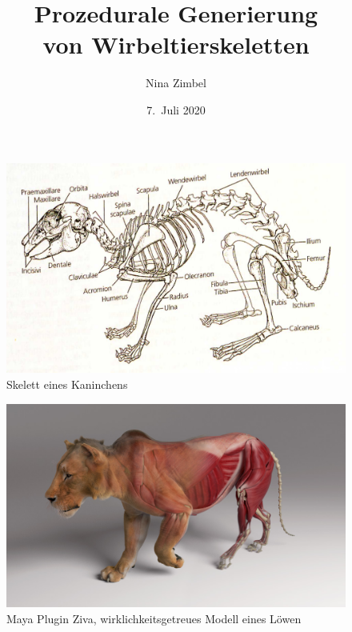 \documentclass{beamer}
\title{Prozedurale Generierung\\ von Wirbeltierskeletten}
\author{Nina Zimbel}
\institute{KIT - Institut für Visualisierung und Datenanalyse}
\date{7.\ Juli 2020}
\begin{document}
\begin{frame}
 \maketitle
\end{frame}

\begin{frame}[focus]
 \begin{figure}
  \centering
  \includegraphics[width=\textwidth]{graphics/kaninchen.jpg}
  \caption{Skelett eines Kaninchens \cite{Spezielle_Zoologie}}
 \end{figure}
\end{frame}

\begin{frame}[focus]
 \begin{figure}
  \centering
  \includegraphics[width=\textwidth]{graphics/ziva-post2.jpg}
  \caption{Maya Plugin Ziva, wirklichkeitsgetreues Modell eines Löwen \cite{Ziva_Lion}}
 \end{figure}
\end{frame}
\end{document}
